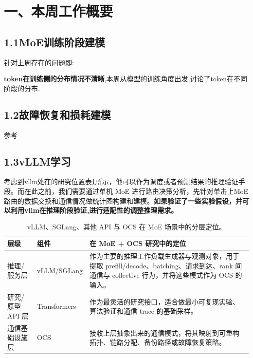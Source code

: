 \documentclass{sjtuweekly}
\begin{document}
\makeweeklytitle   %


\section{一、本周工作概要}

\subsection*{1.1\quad MoE训练阶段建模}
针对上周存在的问题即:
\item \textbf{token在训练侧的分布情况不清晰},本周从模型的训练角度出发,讨论了token在不同阶段的分布.

\item 
\subsection*{1.2\quad 故障恢复和损耗建模}
参考

\subsection*{1.3\quad vLLM学习}

考虑到vllm处在的研究位置表\ref{tab:vllm_moe_ocs_positioning}所示，他可以作为调度或者预测结果的推理验证手段。而在此之前，我们需要通过单机 MoE 进行路由决策分析，先针对单击上MoE路由的数据交换和通信情况做统计图构建和建模。\textbf{如果验证了一些实验假设，并可以利用vllm在推理阶段验证,进行适配性的调整推理需求。}

\begin{table}[htbp]
\centering
\small
\begin{tabularx}{\linewidth}{@{}p{2.4cm}p{3.0cm}X@{}}
\toprule
层级 & 组件 & 在 MoE + OCS 研究中的定位 \\
\midrule

推理/服务层 &
vLLM/SGLang &
作为主要的推理工作负载生成器与观测对象，用于提取 prefill/decode、batching、请求到达、rank 间通信与 collective 行为，并将这些模式作为 OCS 的输入。 \\

研究/原型 API 层 &
Transformers &
作为最灵活的研究接口，适合做最小可复现实验、算法验证和通信 trace 的基础采样。 \\

通信基础设施层 &
OCS &
接收上层抽象出来的通信模式，将其映射到可重构拓扑、链路分配、备份路径或故障恢复策略。 \\

\bottomrule
\end{tabularx}
\caption{vLLM、SGLang、其他 API 与 OCS 在 MoE 场景中的分层定位。}
\label{tab:vllm_moe_ocs_positioning}

\end{table}
\end{document}
